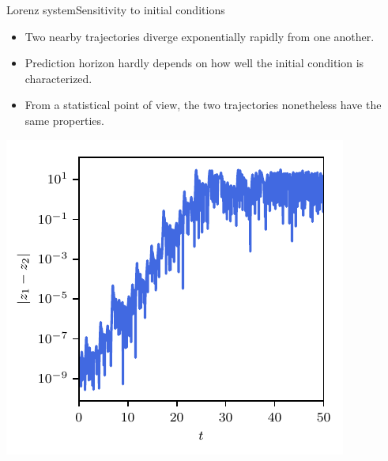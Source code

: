 \documentclass[usenames,dvipsnames,svgnames,10pt,aspectratio=169]{beamer}
\begin{document}
\begin{frame}[t, c]{Lorenz system}{Sensitivity to initial conditions}
	\begin{minipage}{.48\textwidth}
		\begin{itemize}
			\item Two nearby trajectories diverge exponentially rapidly from one another.

			\bigskip

			\item Prediction horizon hardly depends on how well the initial condition is characterized.

			\bigskip

			\item From a statistical point of view, the two trajectories nonetheless have the same properties.
		\end{itemize}
	\end{minipage}%
	\hfill
	\begin{minipage}{.48\textwidth}
		\centering
		\includegraphics[width=.8\textwidth]{sensitivity_initial_conditions_bis}
	\end{minipage}

	\vspace{1cm}
\end{frame}
\end{document}
